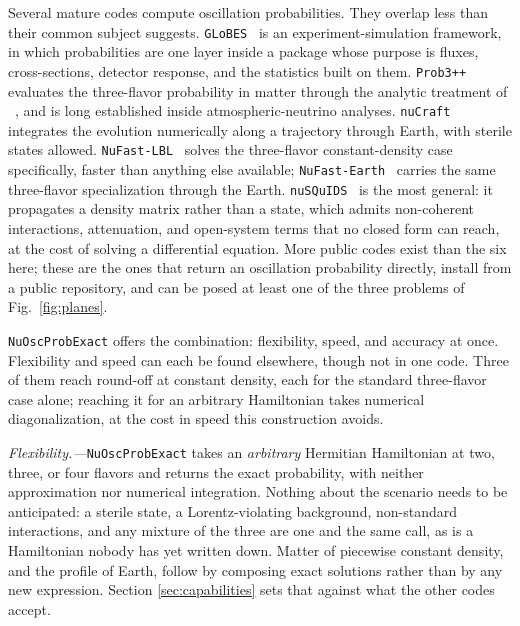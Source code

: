 \documentclass[final,5p,times,twocolumn,sort,compress]{elsarticle}
\newcommand{\fig}{Fig.}
\providecommand{\Ref}{}
\newcommand{\figu}[1]{\fig~\ref{fig:#1}}
\begin{document}
Several mature codes compute oscillation probabilities.  They overlap less than their common subject suggests.  {\tt GLoBES}\ \cite{Huber:2004ka, Huber:2007ji, GLoBES} is an experiment-simulation framework, in which probabilities are one layer inside a package whose purpose is fluxes, cross-sections, detector response, and the statistics built on them.  {\tt Prob3++}\ \cite{Prob3pp} evaluates the three-flavor probability in matter through the analytic treatment of \Ref\ \cite{Barger:1980tf}, and is long established inside atmospheric-neutrino analyses.  {\tt nuCraft}\ \cite{Wallraff:2014qka, nuCraft} integrates the evolution numerically along a trajectory through Earth, with sterile states allowed.  {\tt NuFast-LBL}\ \cite{Denton:2024pzc} solves the three-flavor constant-density case specifically, faster than anything else available; {\tt NuFast-Earth}\ \cite{Denton:2025oxf} carries the same three-flavor specialization through the Earth.  {\tt nuSQuIDS}\ \cite{Arguelles:2021twb, Delgado:2014kpa, NuSQuIDS} is the most general: it propagates a density matrix rather than a state, which admits non-coherent interactions, attenuation, and open-system terms that no closed form can reach, at the cost of solving a differential equation.  More public codes exist than the six here; these are the ones that return an oscillation probability directly, install from a public repository, and can be posed at least one of the three problems of \figu{planes}.

{\tt NuOscProbExact} offers the combination: flexibility, speed, and accuracy at once.  Flexibility and speed can each be found elsewhere, though not in one code.  Three of them reach round-off at constant density, each for the standard three-flavor case alone; reaching it for an arbitrary Hamiltonian takes numerical diagonalization, at the cost in speed this construction avoids.

\smallskip

\textit{Flexibility.---}{\tt NuOscProbExact} takes an \emph{arbitrary} Hermitian Hamiltonian at two, three, or four flavors and returns the exact probability, with neither approximation nor numerical integration.  Nothing about the scenario needs to be anticipated: a sterile state, a Lorentz-violating background, non-standard interactions, and any mixture of the three are one and the same call, as is a Hamiltonian nobody has yet written down.  Matter of piecewise constant density, and the profile of Earth, follow by composing exact solutions rather than by any new expression.  Section \ref{sec:capabilities} sets that against what the other codes accept.
\end{document}
